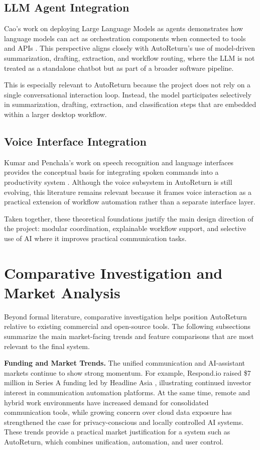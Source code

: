 \subsection{LLM Agent Integration}
Cao's work on deploying Large Language Models as agents demonstrates how language models can act as orchestration components when connected to tools and APIs \cite{cao2024}. This perspective aligns closely with AutoReturn's use of model-driven summarization, drafting, extraction, and workflow routing, where the LLM is not treated as a standalone chatbot but as part of a broader software pipeline.

This is especially relevant to AutoReturn because the project does not rely on a single conversational interaction loop. Instead, the model participates selectively in summarization, drafting, extraction, and classification steps that are embedded within a larger desktop workflow.

\subsection{Voice Interface Integration}
Kumar and Penchala's work on speech recognition and language interfaces provides the conceptual basis for integrating spoken commands into a productivity system \cite{kumar2015}. Although the voice subsystem in AutoReturn is still evolving, this literature remains relevant because it frames voice interaction as a practical extension of workflow automation rather than a separate interface layer.

Taken together, these theoretical foundations justify the main design direction of the project: modular coordination, explainable workflow support, and selective use of AI where it improves practical communication tasks.

\section{Comparative Investigation and Market Analysis}
\noindent Beyond formal literature, comparative investigation helps position AutoReturn relative to existing commercial and open-source tools. The following subsections summarize the main market-facing trends and feature comparisons that are most relevant to the final system.

\textbf{Funding and Market Trends.} The unified communication and AI-assistant markets continue to show strong momentum. For example, Respond.io raised \$7 million in Series A funding led by Headline Asia \cite{technode2022}, illustrating continued investor interest in communication automation platforms. At the same time, remote and hybrid work environments have increased demand for consolidated communication tools, while growing concern over cloud data exposure has strengthened the case for privacy-conscious and locally controlled AI systems. These trends provide a practical market justification for a system such as AutoReturn, which combines unification, automation, and user control.

